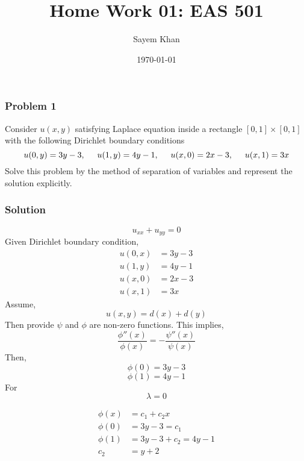 \documentclass{article}
\title{Home Work 01: EAS 501}
\author{Sayem Khan}
\date{\today}
\begin{document}
\maketitle

\subsubsection*{Problem 1}
Consider $u(x, y)$ satisfying Laplace equation inside a rectangle $[0,1]\times[0,1]$ with the following Dirichlet boundary conditions $$u(0, y) = 3y-3,\hspace{5mm} u(1, y) = 4y-1, \hspace{5mm}   u(x,0) = 2x-3,\hspace{5mm}  u(x,1) = 3x$$ Solve this problem by the method of separation of variables and represent the solution explicitly.

\subsubsection*{Solution}
\begin{equation}
    u_{xx} + u_{yy} = 0
    \label{1eqn}
\end{equation}
Given Dirichlet boundary condition,
\begin{equation}
    \begin{split}
        u(0, x) &= 3y -3\\
        u(1, y) &= 4y -1\\
        u(x, 0) &= 2x - 3\\
        u(x, 1) &= 3x
    \end{split}
    \label{boundary}
\end{equation}
Assume,
$$
u(x,y) = d(x) + d(y)
$$
Then provide $\psi$ and $\phi$ are non-zero  functions. 
This implies,
\begin{equation*}
    \frac{\phi''(x)}{\phi(x)} = - \frac{\psi''(x)}{\psi(x)}
\end{equation*}
Then, $$
\phi(0) = 3y -3
$$
$$
\phi(1) = 4y -1
$$
For $$\lambda = 0$$

\begin{equation*}
    \begin{split}
        \phi(x) & = c_1 + c_2 x \\
        \phi(0) &= 3y -3 = c_1 \\
        \phi(1) &= 3y-3 + c_2 = 4y -1 \\
        c_2 &= y + 2
    \end{split}
\end{equation*}
\end{document}
